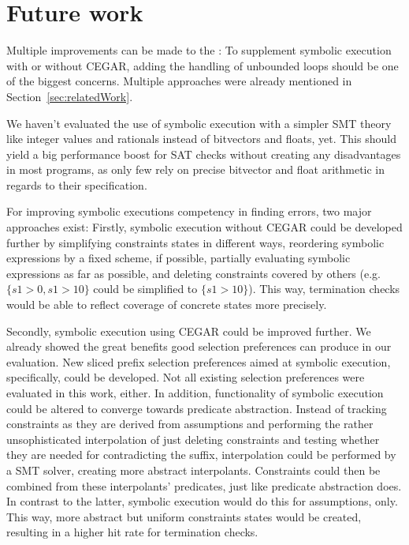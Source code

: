 \chapter{Future work}

Multiple improvements can be made to the \symbolicExecutionCPA:
To supplement symbolic execution with or without CEGAR, adding the handling of unbounded loops should be one of the biggest concerns.
Multiple approaches were already mentioned in Section~\ref{sec:relatedWork}.

We haven't evaluated the use of symbolic execution with a simpler SMT theory like integer values and rationals instead of bitvectors and floats, yet.
This should yield a big performance boost for SAT checks without creating any disadvantages in most programs, as only few rely on precise bitvector and float arithmetic in regards to their specification.

For improving symbolic executions competency in finding errors, two major approaches exist:
Firstly, symbolic execution without CEGAR could be developed further by simplifying constraints states in different ways,
reordering symbolic expressions by a fixed scheme, if possible, partially evaluating symbolic expressions as far as possible,
and deleting constraints covered by others (e.g. $\{ s1 > 0, s1 > 10 \}$ could be simplified to $\{s1 > 10 \}$).
This way, termination checks would be able to reflect coverage of concrete states more precisely.

Secondly, symbolic execution using CEGAR could be improved further.
We already showed the great benefits good selection preferences can produce in our evaluation.
New sliced prefix selection preferences aimed at symbolic execution, specifically, could be developed.
Not all existing selection preferences were evaluated in this work, either.
In addition, functionality of symbolic execution could be altered to converge towards predicate abstraction.
Instead of tracking constraints as they are derived from assumptions and performing the rather unsophisticated interpolation of just deleting constraints and testing whether they are needed for contradicting the suffix,
interpolation could be performed by a SMT solver, creating more abstract interpolants.
Constraints could then be combined from these interpolants' predicates, just like predicate abstraction does.
In contrast to the latter, symbolic execution would do this for assumptions, only.
This way, more abstract but uniform constraints states would be created, resulting in a higher hit rate for termination checks.

